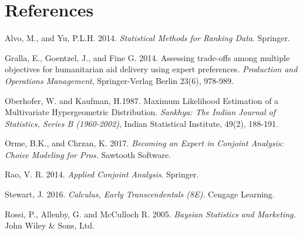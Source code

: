 \documentclass[a4paper, 12pt]{article}
\begin{document}
\section*{References}
\begin{list}{}{\itemindent=-2em}
\small
\item Alvo, M., and Yu, P.L.H. 2014. \emph{Statistical Methods for Ranking Data}. Springer.

\item Gralla, E., Goentzel, J., and Fine G. 2014. Assessing trade-offs among multiple objectives for humanitarian aid delivery using expert preferences.
\emph{Production and Operations Management}, Springer-Verlag Berlin 23(6), 978-989.

\item Oberhofer, W. and Kaufman, H.1987.  Maximum Likelihood Estimation of a Multivariate Hypergeometric Distribution. \emph{Sankhya: The Indian Journal of Statistics, Series B (1960-2002)}, Indian Statistical Institute, 49(2), 188-191. 

\item Orme, B.K., and Chrzan, K. 2017. \emph{Becoming an Expert in Conjoint Analysis: Choice Modeling for Pros.} Sawtooth Software.

\item Rao, V. R. 2014. \emph{Applied Conjoint Analysis}. Springer.

\item  Stewart, J. 2016.  \emph{Calculus, Early Transcendentals (8E)}. Cengage Learning.

\item Rossi, P., Allenby, G. and McCulloch R. 2005. \emph{Baysian Statistics and Marketing.} John Wiley \& Sons, Ltd.


\end{list}
\end{document}
